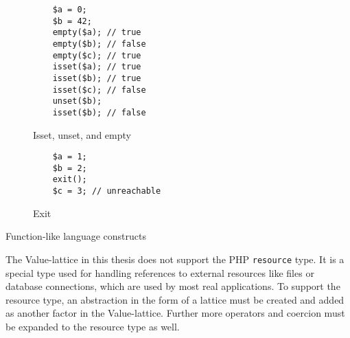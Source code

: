 \begin{program}
\begin{subfigure}[b]{.45\linewidth}
    \begin{lstlisting}
    $a = 0;
    $b = 42;
    empty($a); // true
    empty($b); // false
    empty($c); // true
    isset($a); // true
    isset($b); // true
    isset($c); // false
    unset($b);
    isset($b); // false
\end{lstlisting}
    \caption{Isset, unset, and empty}
\end{subfigure}
\begin{subfigure}[b]{.50\linewidth}
    \begin{lstlisting}
    $a = 1;
    $b = 2;
    exit();
    $c = 3; // unreachable
\end{lstlisting}
    \caption{Exit}
\end{subfigure}
\caption{Function-like language constructs}
\label{lst:languageConstructs}
\end{program}

The Value-lattice in this thesis does not support the PHP \texttt{resource} type. It is a special type used for handling references to external resources like files or database connections, which are used by most real applications. To support the resource type, an abstraction in the form of a lattice must be created and added as another factor in the Value-lattice. Further more operators and coercion must be expanded to the resource type as well.

